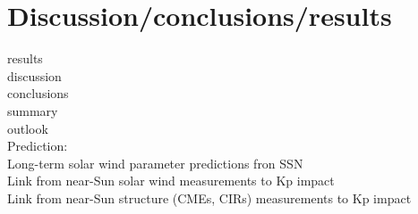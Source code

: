 \chapter[Discussion and results]{Discussion/conclusions/results}


results\\
discussion\\
conclusions\\
summary\\
outlook\\

Prediction:\\
Long-term solar wind parameter predictions fron SSN\\
Link from near-Sun solar wind measurements to Kp impact\\
Link from near-Sun structure (CMEs, CIRs) measurements to Kp impact\\
